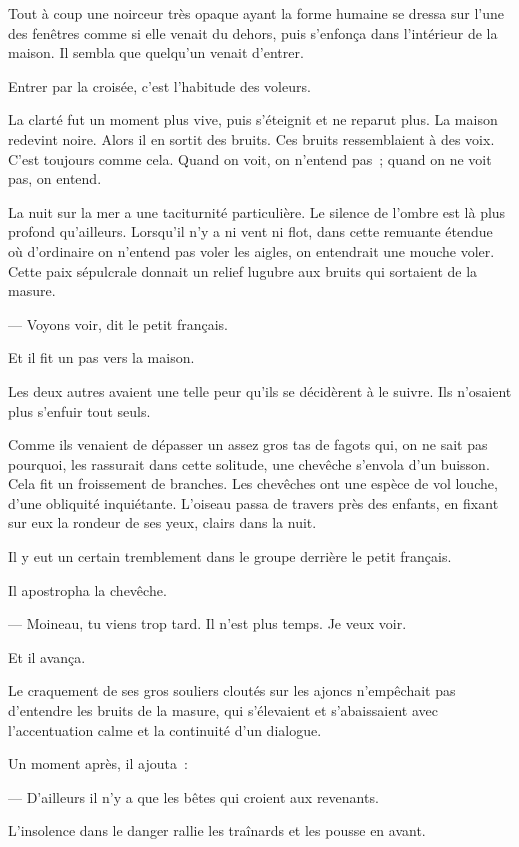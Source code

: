 \documentclass[french,twoside]{book} %
\begin{document}
Tout à coup une noirceur très opaque ayant la forme humaine se dressa sur l’une des fenêtres comme si elle venait du dehors, puis s’enfonça dans l’intérieur de la maison. Il sembla que quelqu’un venait d’entrer.\par
Entrer par la croisée, c’est l’habitude des voleurs.\par
La clarté fut un moment plus vive, puis s’éteignit et ne reparut plus. La maison redevint noire. Alors il en sortit des bruits. Ces bruits ressemblaient à des voix. C’est toujours comme cela. Quand on voit, on n’entend pas ; quand on ne voit pas, on entend.\par
La nuit sur la mer a une taciturnité particulière. Le silence de l’ombre est là plus profond qu’ailleurs. Lorsqu’il n’y a ni vent ni flot, dans cette remuante étendue où d’ordinaire on n’entend pas voler les aigles, on entendrait une mouche voler. Cette paix sépulcrale donnait un relief lugubre aux bruits qui sortaient de la masure.\par
— Voyons voir, dit le petit français.\par
Et il fit un pas vers la maison.\par
 Les deux autres avaient une telle peur qu’ils se décidèrent à le suivre. Ils n’osaient plus s’enfuir tout seuls.\par
Comme ils venaient de dépasser un assez gros tas de fagots qui, on ne sait pas pourquoi, les rassurait dans cette solitude, une chevêche s’envola d’un buisson. Cela fit un froissement de branches. Les chevêches ont une espèce de vol louche, d’une obliquité inquiétante. L’oiseau passa de travers près des enfants, en fixant sur eux la rondeur de ses yeux, clairs dans la nuit.\par
Il y eut un certain tremblement dans le groupe derrière le petit français.\par
Il apostropha la chevêche.\par
— Moineau, tu viens trop tard. Il n’est plus temps. Je veux voir.\par
Et il avança.\par
Le craquement de ses gros souliers cloutés sur les ajoncs n’empêchait pas d’entendre les bruits de la masure, qui s’élevaient et s’abaissaient avec l’accentuation calme et la continuité d’un dialogue.\par
Un moment après, il ajouta :\par
— D’ailleurs il n’y a que les bêtes qui croient aux revenants.\par
L’insolence dans le danger rallie les traînards et les pousse en avant.\par
\end{document}
